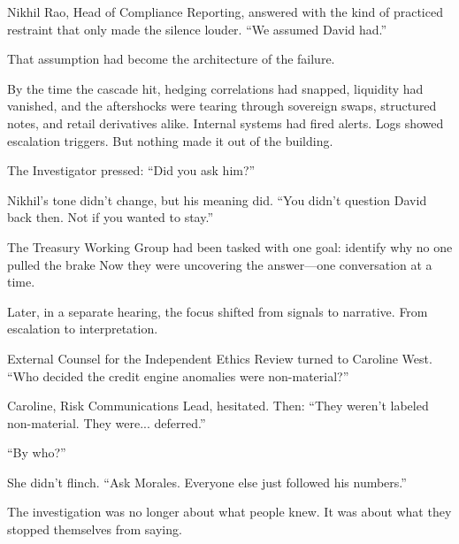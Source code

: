 Nikhil Rao, Head of Compliance Reporting, answered with the kind of practiced restraint that only made the silence louder.
“We assumed David had.”

That assumption had become the architecture of the failure.

By the time the cascade hit, hedging correlations had snapped, liquidity had vanished, and the aftershocks were tearing 
through sovereign swaps, structured notes, and retail derivatives alike.
Internal systems had fired alerts.
Logs showed escalation triggers.
But nothing made it out of the building.

The Investigator pressed:
“Did you ask him?”

Nikhil’s tone didn’t change, but his meaning did.
“You didn’t question David back then. Not if you wanted to stay.”

The Treasury Working Group had been tasked with one goal:
identify why no one pulled the brake
Now they were uncovering the answer—one conversation at a time.

Later, in a separate hearing, the focus shifted from signals to narrative.
From escalation to interpretation.

External Counsel for the Independent Ethics Review turned to Caroline West.
“Who decided the credit engine anomalies were non-material?”

Caroline, Risk Communications Lead, hesitated. Then:
“They weren’t labeled non-material. They were... deferred.”

“By who?”

She didn’t flinch.
“Ask Morales. Everyone else just followed his numbers.”

The investigation was no longer about what people knew.
It was about what they stopped themselves from saying.

\medskip

